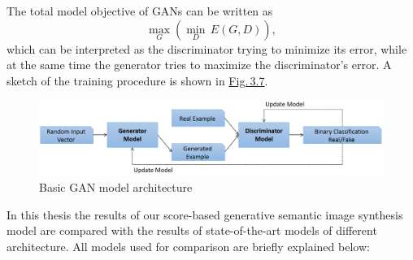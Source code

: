 The total model objective of GANs can be written as 
%
\begin{equation} \label{equ:3.3}
    \underset{G}{\max}\left(\underset{D}{\min}\,E(G,D)\right),
\end{equation}
%
which can be interpreted as the discriminator trying to minimize its error, while at the same time the generator tries to maximize the discriminator's error. A sketch of the training procedure is shown in \hyperref[fig:3.7]{Fig.\,3.7}. 
%
\begin{figure} \label{fig:3.7}
    \centering
    \includegraphics[width=.9\textwidth]{Chapters/figures/gan.PNG}
    \caption[Basic GAN model architecture]{Basic GAN model architecture}
\end{figure}
%

In this thesis the results of our score-based generative semantic image synthesis model are compared with the results of state-of-the-art models of different architecture. All models used for comparison are briefly explained below:

